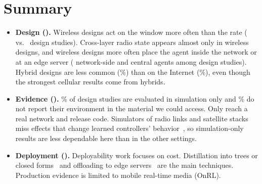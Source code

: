\section{Summary}
\label{sec:wireless-summary}

\begin{itemize}
  \item \textbf{Design ().} Wireless designs act on the window more often than the rate (\nChWirelessActCwnd{} vs.\ \nChWirelessActRate{} design studies). Cross-layer radio state appears almost only in wireless designs, and wireless designs more often place the agent inside the network or at an edge server (\nChWirelessNetwork{} network-side and \nChWirelessCentral{} central agents among \nChWirelessDesign{} design studies). Hybrid designs are less common (\nChWirelessPctHybrid\%) than on the Internet (\nChInternetPctHybrid\%), even though the strongest cellular results come from hybrids.
  \item \textbf{Evidence ().} \nChWirelessPctSim\% of design studies are evaluated in simulation only and \nChWirelessPctNR\% do not report their environment in the material we could access. Only \nChWirelessReal{} reach a real network and \nChWirelessCode{} release code. Simulators of radio links and satellite stacks miss effects that change learned controllers' behavior~\cite{valentine2026emulation}, so simulation-only results are less dependable here than in the other settings.
  \item \textbf{Deployment ().} Deployability work focuses on cost. Distillation into trees or closed forms~\cite{zhong2022muses,martins2021policy,martins2024closed,lu2026wapi} and offloading to edge servers~\cite{wang2025edge,zhang2026transformer,wang2025kontrol} are the main techniques. Production evidence is limited to mobile real-time media (OnRL).
\end{itemize}
